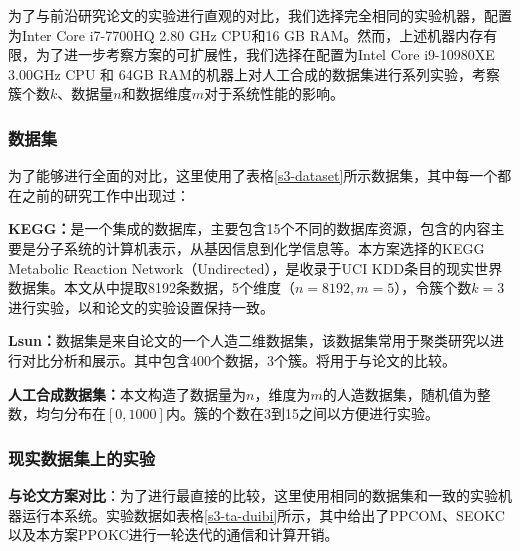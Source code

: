 为了与前沿研究论文\cite{wu2020secure,mohassel2019practical}的实验进行直观的对比，我们选择完全相同的实验机器，配置为Inter Core i7-7700HQ 2.80 GHz CPU和16 GB RAM。然而，上述机器内存有限，为了进一步考察方案的可扩展性，我们选择在配置为Intel Core i9-10980XE 3.00GHz CPU 和 64GB RAM的机器上对人工合成的数据集进行系列实验，考察簇个数$k$、数据量$n$和数据维度$m$对于系统性能的影响。
\subsubsection{数据集}
\begin{table}[htbp]
	\centering
	\renewcommand{\arraystretch}{1.3}
	\caption{数据集详细信息}
	\label{s3-dataset}
\end{table}
为了能够进行全面的对比，这里使用了表格\ref{s3-dataset}所示数据集，其中每一个都在之前的研究工作中出现过：
\begin{compactitem}
	\item \textbf{KEGG：}是一个集成的数据库，主要包含15个不同的数据库资源，包含的内容主要是分子系统的计算机表示，从基因信息到化学信息等。本方案选择的KEGG Metabolic Reaction Network（Undirected），是收录于UCI KDD条目的现实世界数据集\cite{naeem2011kegg}。本文从中提取8192条数据，5个维度（$ n=8192,m=5 $），令簇个数$ k=3 $进行实验，以和论文\cite{wu2020secure}的实验设置保持一致。
	\item \textbf{Lsun：}数据集是来自论文\cite{franti2018k}的一个人造二维数据集，该数据集常用于聚类研究以进行对比分析和展示。其中包含400个数据，3个簇。将用于与论文\cite{jaschke2019unsupervised}的比较。
	\item \textbf{人工合成数据集：}本文构造了数据量为$ n $，维度为$ m $的人造数据集，随机值为整数，均匀分布在$ [0,1000] $内。簇的个数在3到15之间以方便进行实验。
\end{compactitem}

\subsubsection{现实数据集上的实验}
\textbf{与论文\cite{wu2020secure}方案对比}：为了进行最直接的比较，这里使用相同的数据集和一致的实验机器运行本系统。实验数据如表格\ref{s3-ta-duibi}所示，其中给出了PPCOM\cite{rong2017privacy}、SEOKC\cite{wu2020secure}以及本方案PPOKC进行一轮迭代的通信和计算开销。

